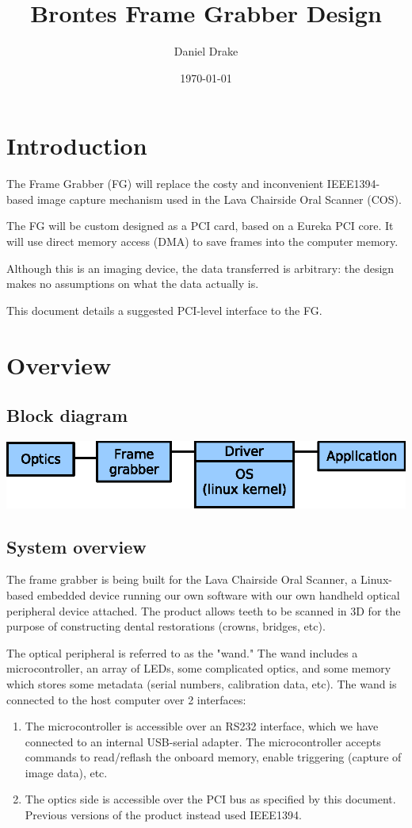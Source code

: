 \documentclass[12pt]{article}
\title{Brontes Frame Grabber Design}
\author{Daniel Drake}
\date{\today}
\begin{document}
\maketitle

\section{Introduction}

The Frame Grabber (FG) will replace the costy and inconvenient IEEE1394-based image capture mechanism used in the Lava Chairside Oral Scanner (COS).

The FG will be custom designed as a PCI card, based on a Eureka PCI core. It will use direct memory access (DMA) to save frames into the computer memory.

Although this is an imaging device, the data transferred is arbitrary: the design makes no assumptions on what the data actually is.

This document details a suggested PCI-level interface to the FG.

\section{Overview}

\subsection{Block diagram}

\includegraphics{block.eps}

\subsection{System overview}

The frame grabber is being built for the Lava Chairside Oral Scanner, a Linux-based embedded device running our own software with our own handheld optical peripheral device attached. The product allows teeth to be scanned in 3D for the purpose of constructing dental restorations (crowns, bridges, etc).

The optical peripheral is referred to as the "wand." The wand includes a microcontroller, an array of LEDs, some complicated optics, and some memory which stores some metadata (serial numbers, calibration data, etc). The wand is connected to the host computer over 2 interfaces:
\begin{enumerate}
\item The microcontroller is accessible over an RS232 interface, which we have connected to an internal USB-serial adapter. The microcontroller accepts commands to read/reflash the onboard memory, enable triggering (capture of image data), etc.
\item The optics side is accessible over the PCI bus as specified by this document. Previous versions of the product instead used IEEE1394.
\end{enumerate}
\end{document}
